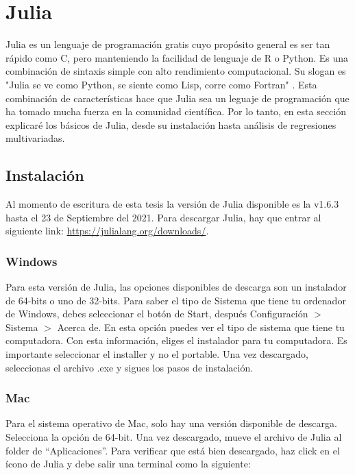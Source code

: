 \chapter{Julia}

Julia es un lenguaje de programación gratis cuyo propósito general es ser tan rápido como C, pero manteniendo la facilidad de lenguaje de R o Python. Es una combinación de sintaxis simple con alto rendimiento computacional. Su slogan es "Julia se ve como Python, se siente como Lisp, corre como Fortran" \citep{Hackers}. 
Esta combinación de características hace que Julia sea un leguaje de programación que ha tomado mucha fuerza en la comunidad científica. Por lo tanto, en esta sección explicaré los básicos de Julia, desde su instalación hasta análisis de regresiones multivariadas. 

\section{Instalación}
Al momento de escritura de esta tesis la versión de Julia disponible es la v1.6.3 hasta el 23 de Septiembre del 2021. Para descargar Julia, hay que entrar al siguiente link: \url{https://julialang.org/downloads/}. 

\subsection{Windows}
Para esta versión de Julia, las opciones disponibles de descarga son un instalador de 64-bits o uno de 32-bits. Para saber el tipo de Sistema que tiene tu ordenador de Windows, debes seleccionar el botón de \textsf{Start}, después \textsf{Configuración} $>$ \textsf{Sistema} $>$ \textsf{Acerca de}. En esta opción puedes ver el tipo de sistema que tiene tu computadora. Con esta información, eliges el instalador para tu computadora. Es importante seleccionar el \textsf{installer} y no el \textsf{portable}. Una vez descargado, seleccionas el archivo \textsf{.exe} y sigues los pasos de instalación. 


\subsection{Mac}
Para el sistema operativo de Mac, solo hay una versión disponible de descarga. Selecciona la opción de 64-bit. Una vez descargado, mueve el archivo de Julia al folder de \textquotedblleft Aplicaciones\textquotedblright. Para verificar que está bien descargado, haz click en el ícono de Julia y debe salir una terminal como la siguiente: 


